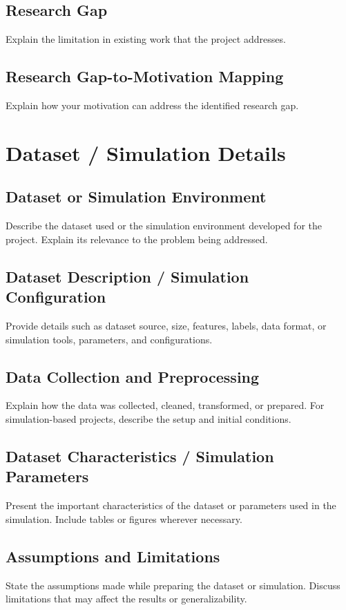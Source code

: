 \documentclass[12pt,a4paper]{report}
\begin{document}
\section{Research Gap}
Explain the limitation in existing work that the project addresses.

\section{Research Gap-to-Motivation Mapping}
Explain how your motivation can address the identified research gap.

\chapter{Dataset / Simulation Details}
\section{Dataset or Simulation Environment}
Describe the dataset used or the simulation environment developed
for the project. Explain its relevance to the problem being addressed.

\section{Dataset Description / Simulation Configuration}
Provide details such as dataset source, size, features, labels,
data format, or simulation tools, parameters, and configurations.

\section{Data Collection and Preprocessing}
Explain how the data was collected, cleaned, transformed, or prepared.
For simulation-based projects, describe the setup and initial conditions.

\section{Dataset Characteristics / Simulation Parameters}
Present the important characteristics of the dataset or parameters
used in the simulation. Include tables or figures wherever necessary.

\section{Assumptions and Limitations}
State the assumptions made while preparing the dataset or simulation.
Discuss limitations that may affect the results or generalizability.
\end{document}
